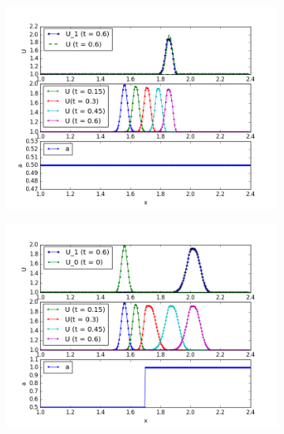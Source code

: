 \documentclass{article}
\begin{document}
\begin{figure}[h]
    \caption{Гауссиан}
    \begin{subfigure}{0.33\textwidth}
    \includegraphics[width=1\linewidth]{TVD_tests/lim_MC_a_const_U0_gauss.png}
    \end{subfigure}
    \begin{subfigure}{0.33\textwidth}
    \includegraphics[width=1\linewidth]{TVD_tests/lim_MC_a_devided_U0_gauss.png}
    \end{subfigure}
    \begin{subfigure}{0.33\textwidth}

\end{subfigure}
\end{figure}
\end{document}
